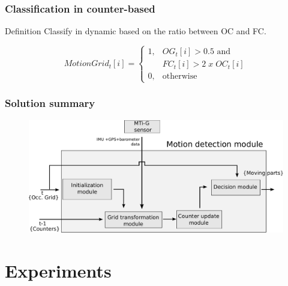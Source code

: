 \documentclass{beamer}
\begin{document}
	\begin{frame}
		\frametitle{Classification in counter-based}
		
		\begin{block}{Definition}
		Classify in dynamic based on the ratio between OC and FC. 
		\end{block}		
		
		\begin{equation}
		MotionGrid_t[i] = \begin{cases} 1, & \mbox{$OG_t[i] > 0.5$ and} \\ & \mbox {$FC_t[i]>2\;  x \; OC_t[i]$} \\
		                                0, & \mbox{otherwise}\end{cases}
		\end{equation}		
		
	\end{frame}	

	\begin{frame}
		\frametitle{Solution summary}
		\begin{figure}[h]
			\center
			\includegraphics[scale=0.40]{../img/fig:motion:framework:motionmodule}
		 \end{figure}
	\end{frame}	


\section{Experiments}
\end{document}
